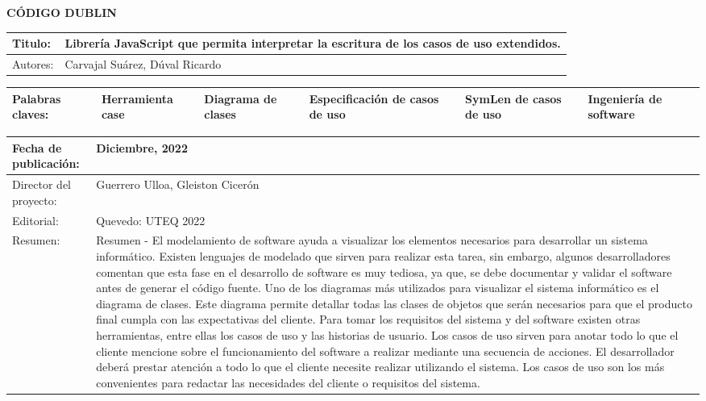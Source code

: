\begin{center}
	{\LARGE \textbf{CÓDIGO DUBLIN}}
\end{center}

\begin{table}[h!]
	\begin{tabular}{| p{2.2cm} | p{12cm} |}
		\hline
		Titulo: & Librería JavaScript que permita interpretar la escritura de los casos de uso extendidos. \\ \hline
		Autores: & Carvajal Suárez, Dúval Ricardo \\ \hline
	\end{tabular}
	\begin{tabular} {| p{2.2cm} | p{2.1cm} | p{1.5cm} | p{2.6cm} | p{2.1cm} | p{1.96cm} |}  
		Palabras claves: & Herramienta case & Diagrama de clases & Especificación de casos de uso  & SymLen de casos de uso & Ingeniería de software \\ \hline
	\end{tabular}
	\begin{tabular}{| p{2.2cm} | p{12cm} |}
		Fecha de publicación: & Diciembre, 2022 \\ \hline
		Director del proyecto: & Guerrero Ulloa, Gleiston Cicerón  \\ \hline
		Editorial: & Quevedo: UTEQ 2022  \\ \hline
		Resumen: &  {\small Resumen - El modelamiento de software ayuda a visualizar los elementos necesarios para desarrollar un sistema informático. Existen lenguajes de modelado que sirven para realizar esta tarea, sin embargo, algunos desarrolladores comentan que esta fase en el desarrollo de software es muy tediosa, ya que, se debe documentar y validar el software antes de generar el código fuente. Uno de los diagramas más utilizados para visualizar el sistema informático es el diagrama de clases. Este diagrama permite detallar todas las clases de objetos que serán necesarios para que el producto final cumpla con las expectativas del cliente. Para tomar los requisitos del sistema y del software existen otras herramientas, entre ellas los casos de uso y las historias de usuario. Los casos de uso sirven para anotar todo lo que el cliente mencione sobre el funcionamiento del software a realizar mediante una secuencia de acciones. El desarrollador deberá prestar atención a todo lo que el cliente necesite realizar utilizando el sistema. Los casos de uso son los más convenientes para redactar las necesidades del cliente o requisitos del sistema.} \\

\end{tabular}
\end{table}
